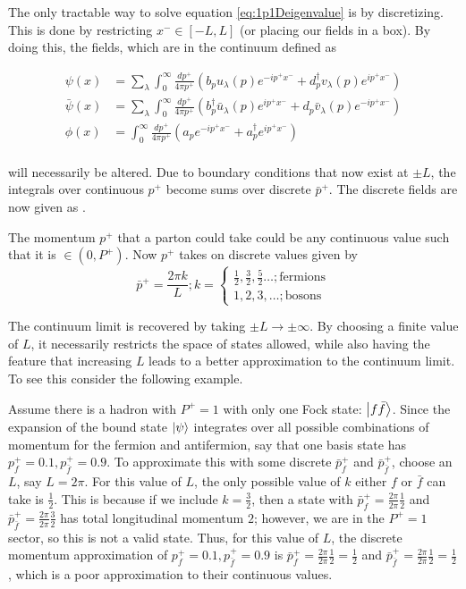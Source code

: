 The only tractable way to solve equation \ref{eq:1p1Deigenvalue} is by discretizing.
This is done by restricting $x^- \in [-L, L]$ (or placing our fields in a box). 
By doing this, the fields, which are in the continuum defined as 

\begin{align}
    \psi(x) &= \sum_\lambda \int_0^\infty \frac{dp^+}{4\pi p^+} \left(b_p u_\lambda(p) e^{-ip^+x^-} + d_p^\dagger v_\lambda(p) e^{ip^+x^-}\right)\\
    \bar \psi(x) &= \sum_\lambda \int_0^\infty \frac{dp^+}{4\pi p^+} \left(b_p^\dagger \bar u_\lambda(p) e^{ip^+x^-} + d_p \bar v_\lambda(p) e^{-ip^+x^-}\right)\\
    \phi(x) &= \int_0^\infty \frac{dp^+}{4\pi p^+}\left(a_p e^{-ip^+x^-} + a_p^\dagger e^{ip^+x^-}\right) \\ \nonumber
\end{align}

will necessarily be altered. 
Due to boundary conditions that now exist at $\pm L$, the integrals over continuous $p^+$ become sums over discrete $\bar p^+$.
The discrete fields are now given as .

The momentum $p^+$ that a parton could take could be any continuous value such that it is $\in (0, P^+)$.
Now $p^+$ takes on discrete values given by
\begin{equation}
    \label{eq:discretemomentum}
    \bar p^+ = \frac{2\pi k}{L}; k = 
\begin{cases}
    \frac{1}{2},\frac{3}{2},\frac{5}{2} \dots ; \text{fermions}\\
    1, 2, 3, \dots ; \text{bosons}
\end{cases}\end{equation}

The continuum limit is recovered by taking $\pm L \rightarrow \pm \infty$.
By choosing a finite value of $L$, it necessarily restricts the space of states allowed, while also having the feature that increasing $L$ leads to a better approximation to the continuum limit.
To see this consider the following example.

Assume there is a hadron with $P^+ = 1$ with only one Fock state: $\ket{f\bar f}$.
Since the expansion of the bound state $\ket{\psi}$ integrates over all possible combinations of momentum for the fermion and antifermion, say that one basis state has $p_f^+ = 0.1, p_{\bar{f}}^+ = 0.9$.
To approximate this with some discrete $\bar p_f^+$ and $\bar p_{\bar f}^+$, choose an $L$, say $L = 2\pi$.
For this value of $L$, the only possible value of $k$ either $f$ or $\bar f$ can take is $\frac{1}{2}$.
This is because if we include $k = \frac{3}{2}$, then a state with $\bar p_f^+ = \frac{2\pi}{2\pi}\frac{1}{2}$ and $\bar p_{\bar f}^+ = \frac{2\pi}{2\pi}\frac{3}{2}$ has total longitudinal momentum $2$; however, we are in the $P^+ = 1$ sector, so this is not a valid state. 
Thus, for this value of $L$, the discrete momentum approximation of $p_f^+ = 0.1, p_{\bar{f}}^+ = 0.9$ is $\bar p_f^+ = \frac{2\pi}{2\pi}\frac{1}{2} = \frac{1}{2}$ and $\bar p_{\bar f}^+ = \frac{2\pi}{2\pi}\frac{1}{2} = \frac{1}{2}$, which is a poor approximation to their continuous values. 

